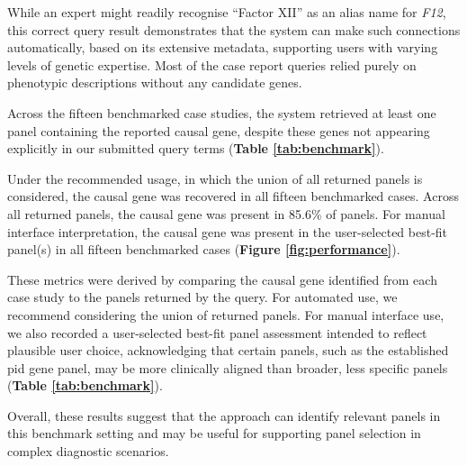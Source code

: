 While an expert might readily recognise ``Factor XII'' as an alias name for \textit{F12}, this correct query result demonstrates that the system can make such connections automatically, based on its extensive metadata, supporting users with varying levels of genetic expertise. Most of the case report queries relied purely on phenotypic descriptions without any candidate genes.

Across the fifteen benchmarked case studies, the system retrieved at least one panel containing the reported causal gene, despite these genes not appearing explicitly in our submitted query terms (\textbf{Table \ref{tab:benchmark}}).

 
 Under the recommended usage, in which the union of all returned panels is considered, the causal gene was recovered in all fifteen benchmarked cases. Across all returned panels, the causal gene was present in 85.6\% of panels. For manual interface interpretation, the causal gene was present in the user-selected best-fit panel(s) in all fifteen benchmarked cases (\textbf{Figure \ref{fig:performance}}).
 
These metrics were derived by comparing the causal gene identified from each case study to the panels returned by the query. For automated use, we recommend considering the union of returned panels. For manual interface use, we also recorded a user-selected best-fit panel assessment intended to reflect plausible user choice, acknowledging that certain panels, such as the established \ac{pid} gene panel, may be more clinically aligned than broader, less specific panels (\textbf{Table \ref{tab:benchmark}}).
  
Overall, these results suggest that the approach can identify relevant panels in this benchmark setting and may be useful for supporting panel selection in complex diagnostic scenarios.


